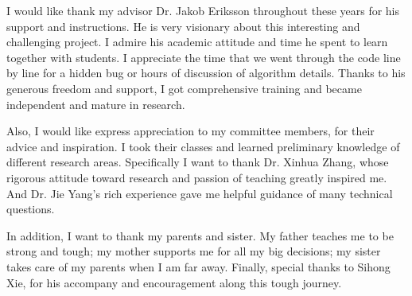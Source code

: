 \acknowledgment

I would like thank my advisor Dr. Jakob Eriksson throughout these years for his support and instructions.
He is very visionary about this interesting and challenging project. 
I admire his academic attitude and time he spent to learn together with students.
I appreciate the time that we went through the code line by line for a hidden bug or hours of discussion of algorithm details. 
Thanks to his generous freedom and support, I got comprehensive training and became independent and mature in research.

Also, I would like express appreciation to my committee members, for their advice and inspiration. 
I took their classes and learned preliminary knowledge of different research areas. 
Specifically I want to thank Dr. Xinhua Zhang, whose rigorous attitude toward research and passion of teaching greatly inspired me. 
And Dr. Jie Yang's rich experience gave me helpful guidance of many technical questions.

In addition, I want to thank my parents and sister.
My father teaches me to be strong and tough; my mother supports me for all my big decisions; my sister takes care of my parents when I am far away.
Finally, special thanks to Sihong Xie, for his accompany and encouragement along this tough journey. 
